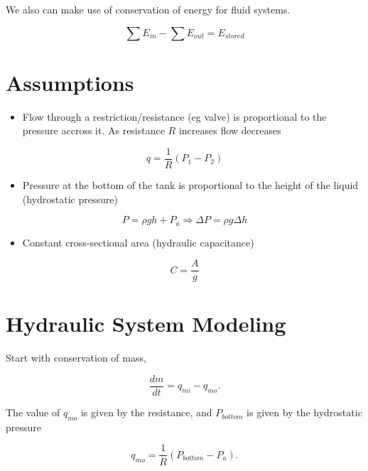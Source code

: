 \documentclass[12pt, a4paper]{report}
\begin{document}
  We also can make use of conservation of energy for fluid systems.

  \begin{equation}
    \sum E_{in} - \sum E_{out} = E_{stored}
  \end{equation}

  \section{Assumptions}

  \begin{itemize}
    \item Flow through a restriction/resistance (eg valve) is proportional to the pressure accross it. As resistance $ R $ increases flow decreases
  \end{itemize}

  \begin{equation}
    q = \frac{1}{R} \left( P_1 - P_2 \right)
  \end{equation}

  \begin{itemize}
    \item Pressure at the bottom of the tank is proportional to the height of the liquid (hydrostatic pressure)
  \end{itemize}

  \begin{equation}
    P = \rho gh + P_a \Rightarrow \Delta P = \rho g \Delta h
  \end{equation}

  \begin{itemize}
    \item Constant cross-sectional area (hydraulic capacitance)
  \end{itemize}

  \begin{equation}
    C = \frac{A}{g}
  \end{equation}

  \section{Hydraulic System Modeling}

  Start with conservation of mass,

  \[
      \frac{dm}{dt} = q_{mi} - q_{mo}
    .\]

  The value of $ q_{mo} $ is given by the resistance, and $ P_{bottom} $ is given by the hydrostatic pressure

  \[
      q_{mo} = \frac{1}{R} \left( P_{bottom} - P_a \right)
    .\]
\end{document}
